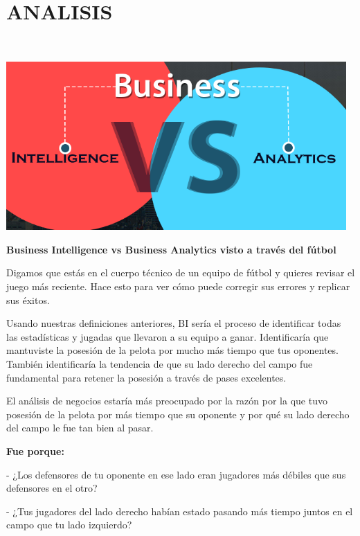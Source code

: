 \section{ANALISIS} 
\begin{flushleft}
\textbf{}\\
\begin{center}
\includegraphics[width=13cm]{./Imagenes/image01}
\end{center}
\begin{center}
\textbf{Business Intelligence vs Business Analytics visto a través del fútbol}\\
\end{center}
\item 
Digamos que estás en el cuerpo técnico de un equipo de fútbol y quieres revisar el juego más reciente. Hace esto para ver cómo puede corregir sus errores y replicar sus éxitos.
\item 
Usando nuestras definiciones anteriores,  BI  sería el proceso de identificar todas las estadísticas y jugadas que llevaron a su equipo a ganar. Identificaría que mantuviste la posesión de la pelota por mucho más tiempo que tus oponentes. También identificaría la tendencia de que su lado derecho del campo fue fundamental para retener la posesión a través de pases excelentes.
\item 
El análisis de negocios  estaría más preocupado por la  razón por la  que tuvo posesión de la pelota por más tiempo que su oponente y por qué su lado derecho del campo le fue tan bien al pasar.
\item 
\item 
\textbf{Fue porque:}\\
\item 
- ¿Los defensores de tu oponente en ese lado eran jugadores más débiles que sus defensores en el otro?
\item 
- ¿Tus jugadores del lado derecho habían estado pasando más tiempo juntos en el campo que tu lado izquierdo?

\end{flushleft}
